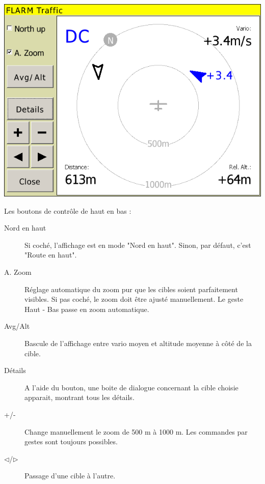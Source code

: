 \begin{center}
\includegraphics[angle=0,width=0.8\linewidth,keepaspectratio='true']{figures/dialog-flarm1.png}
\end{center}

Les boutons de contrôle de haut en bas :
\begin{description}
\item[Nord en haut]  Si coché, l'affichage est en mode "Nord en haut". Sinon, par défaut, c'est "Route en haut".
\item[A. Zoom]   Réglage automatique du zoom pur que les cibles soient parfaitement visibles. Si pas coché, le zoom doit être ajusté manuellement. Le geste Haut - Bas passe en zoom automatique.
\item[Avg/Alt]   Bascule de l'affichage entre vario moyen et altitude moyenne à côté de la cible.
\item[Détails]   A l'aide du bouton, une boite de dialogue concernant la cible choisie apparait, montrant tous les détails.
\item[+/-]   Change manuellement le zoom de 500 m à 1000 m. Les commandes par gestes sont toujours possibles.
\item[$\triangleleft$/$\triangleright$]   Passage d'une cible à l'autre.
\end{description}

